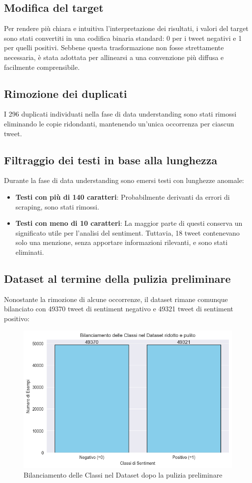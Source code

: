 \documentclass[12pt,a4paper]{report} %
\begin{document}
\subsection{Modifica del target}
Per rendere più chiara e intuitiva l'interpretazione dei risultati, i valori del target sono stati convertiti in una codifica binaria standard: 0 per i tweet negativi e 1 per quelli positivi. Sebbene questa trasformazione non fosse strettamente necessaria, è stata adottata per allinearsi a una convenzione più diffusa e facilmente comprensibile. 
\subsection{Rimozione dei duplicati}
I 296 duplicati individuati nella fase di data understanding sono stati rimossi eliminando le copie ridondanti, mantenendo un'unica occorrenza per ciascun tweet.
\subsection{Filtraggio dei testi in base alla lunghezza}
Durante la fase di data understanding sono emersi testi con lunghezze anomale:
\begin{itemize}
    \item \textbf{Testi con più di 140 caratteri}: Probabilmente derivanti da errori di scraping, sono stati rimossi.
    \item \textbf{Testi con meno di 10 caratteri}: La maggior parte di questi conserva un significato utile per l'analisi del sentiment. Tuttavia, 18 tweet contenevano solo una menzione, senza apportare informazioni rilevanti, e sono stati eliminati.
\end{itemize}
\subsection{Dataset al termine della pulizia preliminare}
Nonostante la rimozione di alcune occorrenze, il dataset rimane comunque bilanciato con 49370 tweet di sentiment negativo e 49321 tweet di sentiment positivo:
\begin{figure}[H]
    \centering
    \includegraphics[width=0.75\linewidth]{immagini/bilanciamento_sentiment140_clean.png}
    \caption{Bilanciamento delle Classi nel Dataset dopo la pulizia preliminare}
    \label{fig:enter-label}
\end{figure}
\end{document}
